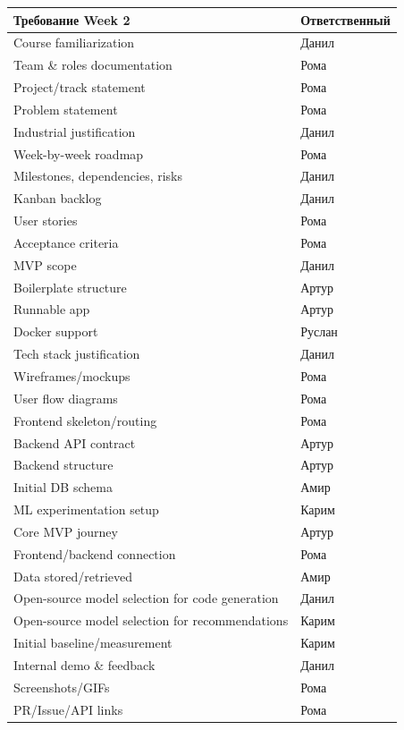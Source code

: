 \documentclass[12pt,a4paper]{article}
\begin{document}
\begin{longtable}{|p{}|p{}|}
\hline
\textbf{Требование Week 2} & \textbf{Ответственный} \\
\hline
Course familiarization & Данил \\
\hline
Team \& roles documentation & Рома \\
\hline
Project/track statement & Рома \\
\hline
Problem statement & Рома \\
\hline
Industrial justification & Данил \\
\hline
Week-by-week roadmap & Рома \\
\hline
Milestones, dependencies, risks & Данил \\
\hline
Kanban backlog & Данил \\
\hline
User stories & Рома \\
\hline
Acceptance criteria & Рома \\
\hline
MVP scope & Данил \\
\hline
Boilerplate structure & Артур \\
\hline
Runnable app & Артур \\
\hline
Docker support & Руслан \\
\hline
Tech stack justification & Данил \\
\hline
Wireframes/mockups & Рома \\
\hline
User flow diagrams & Рома \\
\hline
Frontend skeleton/routing & Рома \\
\hline
Backend API contract & Артур \\
\hline
Backend structure & Артур \\
\hline
Initial DB schema & Амир \\
\hline
ML experimentation setup & Карим \\
\hline
Core MVP journey & Артур \\
\hline
Frontend/backend connection & Рома \\
\hline
Data stored/retrieved & Амир \\
\hline
Open-source model selection for code generation & Данил \\
\hline
Open-source model selection for recommendations & Карим \\
\hline
Initial baseline/measurement & Карим \\
\hline
Internal demo \& feedback & Данил \\
\hline
Screenshots/GIFs & Рома \\
\hline
PR/Issue/API links & Рома \\
\hline
\end{longtable}
\end{document}
